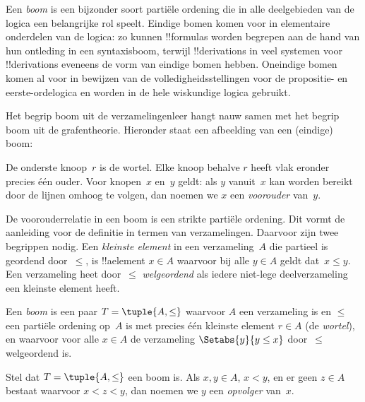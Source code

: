 \documentclass[../../../include/open-logic-section]{subfiles}
\begin{document}

Een \emph{boom} is een bijzonder soort partiële ordening die in alle
deelgebieden van de logica een belangrijke rol speelt. Eindige bomen
komen voor in elementaire onderdelen van de logica: zo kunnen
!!{formula}s worden begrepen aan de hand van hun ontleding in een
syntaxisboom, terwijl !!{derivation}s in veel systemen voor
!!{derivation}s eveneens de vorm van eindige bomen hebben.
%
Oneindige bomen komen al voor in bewijzen van de
volledigheidsstellingen voor de propositie- en eerste-ordelogica en
worden in de hele wiskundige logica gebruikt.

Het begrip boom uit de verzamelingenleer hangt nauw samen met het
begrip boom uit de grafentheorie. Hieronder staat een afbeelding van
een (eindige) boom:

\begin{center}
\end{center}

De onderste knoop~$r$ is de wortel. Elke knoop behalve $r$ heeft vlak
eronder precies één ouder. Voor knopen~$x$ en~$y$ geldt: als $y$
vanuit~$x$ kan worden bereikt door de lijnen omhoog te volgen, dan
noemen we $x$ een \emph{voorouder} van~$y$.

De voorouderrelatie in een boom is een strikte partiële ordening. Dit
vormt de aanleiding voor de definitie in termen van verzamelingen.
Daarvoor zijn twee begrippen nodig. Een \emph{kleinste element} in een
verzameling~$A$ die partieel is geordend door~$\le$, is !!a{element}
$x \in A$ waarvoor bij alle $y \in A$ geldt dat~$x \le y$. Een
verzameling heet door~$\le$ \emph{welgeordend} als iedere niet-lege
deelverzameling een kleinste element heeft.

\begin{defn}[Boom]
Een \emph{boom} is een paar $T = \tuple{A, \le}$ waarvoor $A$ een
verzameling is en $\le$ een partiële ordening op~$A$ is met precies één
kleinste element $r \in A$ (de \emph{wortel}), en waarvoor voor alle
$x \in A$ de verzameling $\Setabs{y}{y \le x}$ door~$\le$
welgeordend is.
\end{defn}

\begin{defn}[Opvolgers]
Stel dat $T = \tuple{A, \le}$ een boom is.
Als $x,y \in A$, $x < y$, en er geen $z \in A$ bestaat waarvoor
$x < z < y$, dan noemen we $y$ een \emph{opvolger} van~$x$.
\end{defn}
\end{document}

